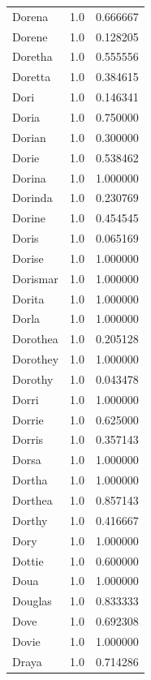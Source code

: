 \documentclass[
  letterpaper,
  DIV=11,
  numbers=noendperiod]{scrreprt}
\begin{document}
\begin{tabular}{lrr}
Dorena          &   1.0 &   0.666667 \\
Dorene          &   1.0 &   0.128205 \\
Doretha         &   1.0 &   0.555556 \\
Doretta         &   1.0 &   0.384615 \\
Dori            &   1.0 &   0.146341 \\
Doria           &   1.0 &   0.750000 \\
Dorian          &   1.0 &   0.300000 \\
Dorie           &   1.0 &   0.538462 \\
Dorina          &   1.0 &   1.000000 \\
Dorinda         &   1.0 &   0.230769 \\
Dorine          &   1.0 &   0.454545 \\
Doris           &   1.0 &   0.065169 \\
Dorise          &   1.0 &   1.000000 \\
Dorismar        &   1.0 &   1.000000 \\
Dorita          &   1.0 &   1.000000 \\
Dorla           &   1.0 &   1.000000 \\
Dorothea        &   1.0 &   0.205128 \\
Dorothey        &   1.0 &   1.000000 \\
Dorothy         &   1.0 &   0.043478 \\
Dorri           &   1.0 &   1.000000 \\
Dorrie          &   1.0 &   0.625000 \\
Dorris          &   1.0 &   0.357143 \\
Dorsa           &   1.0 &   1.000000 \\
Dortha          &   1.0 &   1.000000 \\
Dorthea         &   1.0 &   0.857143 \\
Dorthy          &   1.0 &   0.416667 \\
Dory            &   1.0 &   1.000000 \\
Dottie          &   1.0 &   0.600000 \\
Doua            &   1.0 &   1.000000 \\
Douglas         &   1.0 &   0.833333 \\
Dove            &   1.0 &   0.692308 \\
Dovie           &   1.0 &   1.000000 \\
Draya           &   1.0 &   0.714286 \\

\end{tabular}
\end{document}
